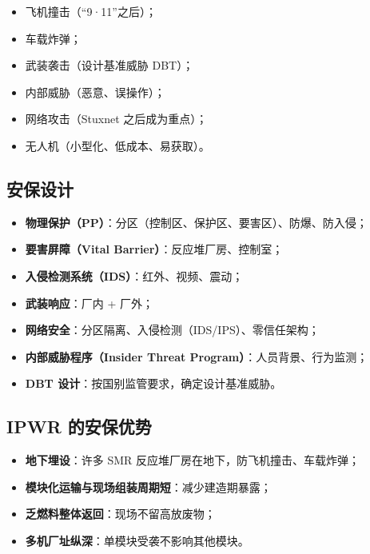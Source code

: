 \documentclass[
  UTF8,
  scheme=plain,
  fontsize=10pt,
  openany
]{ctexbook}
\begin{document}
\begin{itemize}
\tightlist
\item
  飞机撞击（``9·11''之后）；
\item
  车载炸弹；
\item
  武装袭击（设计基准威胁 DBT）；
\item
  内部威胁（恶意、误操作）；
\item
  网络攻击（Stuxnet 之后成为重点）；
\item
  无人机（小型化、低成本、易获取）。
\end{itemize}

\subsection{安保设计}\label{ux5b89ux4fddux8bbeux8ba1}

\begin{itemize}
\tightlist
\item
  \textbf{物理保护（PP）}：分区（控制区、保护区、要害区）、防爆、防入侵；
\item
  \textbf{要害屏障（Vital Barrier）}：反应堆厂房、控制室；
\item
  \textbf{入侵检测系统（IDS）}：红外、视频、震动；
\item
  \textbf{武装响应}：厂内 + 厂外；
\item
  \textbf{网络安全}：分区隔离、入侵检测（IDS/IPS）、零信任架构；
\item
  \textbf{内部威胁程序（Insider Threat Program）}：人员背景、行为监测；
\item
  \textbf{DBT 设计}：按国别监管要求，确定设计基准威胁。
\end{itemize}

\subsection{IPWR 的安保优势}\label{ipwr-ux7684ux5b89ux4fddux4f18ux52bf}

\begin{itemize}
\tightlist
\item
  \textbf{地下埋设}：许多 SMR 反应堆厂房在地下，防飞机撞击、车载炸弹；
\item
  \textbf{模块化运输与现场组装周期短}：减少建造期暴露；
\item
  \textbf{乏燃料整体返回}：现场不留高放废物；
\item
  \textbf{多机厂址纵深}：单模块受袭不影响其他模块。
\end{itemize}
\end{document}
